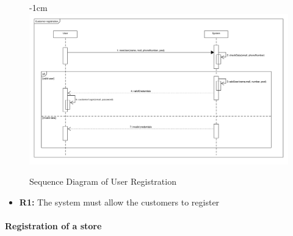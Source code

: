 \documentclass{article}
\begin{document}
\begin{center}
\begin{adjustwidth}{-2.8cm}{}
					
					

					\begin{figure}[!h]
						\begin{adjustwidth} {-1cm}{}
							\includegraphics[scale=0.36]{SD/1_customerRegistration.pdf}
						\end{adjustwidth}
						\caption{Sequence Diagram of User Registration}
					\end{figure}

					

					\end{adjustwidth}
					\begin{itemize}
					\medskip
					 {\bfseries Required functional requirements: }
					\item {\bfseries R1: } The system must allow the customers to register


					\end{itemize}
				\end{center}
		\bigskip
			\paragraph{Registration of a store}
			
\end{document}
